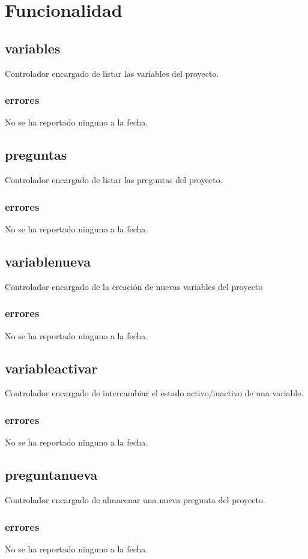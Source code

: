 \documentclass[10pt,a4paper]{book}
\begin{document}
	\section{Funcionalidad}

	\subsection{variables}
	Controlador encargado de listar las variables del proyecto.
	\subsubsection{errores}
	No se ha reportado ninguno a la fecha.

	\subsection{preguntas}
	Controlador encargado de listar las preguntas del proyecto.
	\subsubsection{errores}
	No se ha reportado ninguno a la fecha.

	\subsection{variablenueva}
	Controlador encargado de la creación de nuevas variables del proyecto
	\subsubsection{errores}
	No se ha reportado ninguno a la fecha.

	\subsection{variableactivar}
	Controlador encargado de intercambiar el estado activo/inactivo de una variable.
	\subsubsection{errores}
	No se ha reportado ninguno a la fecha.

	\subsection{preguntanueva}
	Controlador encargado de almacenar una nueva pregunta del proyecto.
	\subsubsection{errores}
	No se ha reportado ninguno a la fecha.
\end{document}
